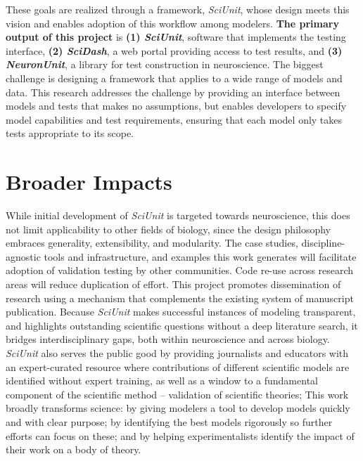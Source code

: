 \documentclass[11pt,letterpaper]{article}
\begin{document}
These goals are realized through a framework, \textit{SciUnit}, whose design meets this vision and enables adoption of this workflow among modelers. 
\textbf{The primary output of this project} is \textbf{(1) \textit{SciUnit}}, software that implements the testing interface, \textbf{(2) \textit{SciDash}}, a web portal providing access to test results, and \textbf{(3) \textit{NeuronUnit}}, a library for test construction in neuroscience.  
The biggest challenge is designing a framework that applies to a wide range of models and data.  
This research addresses the challenge by providing an interface between models and tests that makes no assumptions, but enables developers to specify model capabilities and test requirements, ensuring that each model only takes tests appropriate to its scope.  

\section{Broader Impacts}
While initial development of \textit{SciUnit} is targeted towards neuroscience, this does not limit applicability to other fields of biology, since the design philosophy embraces generality, extensibility, and modularity. 
The case studies, discipline-agnostic tools and infrastructure, and examples this work generates will facilitate adoption of validation testing by other communities.  
Code re-use across research areas will reduce duplication of effort.  
This project promotes dissemination of research using a mechanism that complements the existing system of manuscript publication.  
Because \textit{SciUnit} makes successful instances of modeling transparent, and highlights outstanding scientific questions without a deep literature search, it bridges interdisciplinary gaps, both within neuroscience and across biology. 
\textit{SciUnit} also serves the public good by providing journalists and educators with an expert-curated resource where contributions of different scientific models are identified without expert training, as well as a window to a fundamental component of the scientific method – validation of scientific theories;
This work broadly transforms science: by giving modelers a tool to develop models quickly and with clear purpose; 
by identifying the best models rigorously so further efforts can focus on these; and by helping experimentalists identify the impact of their work on a body of theory.
\end{document}
